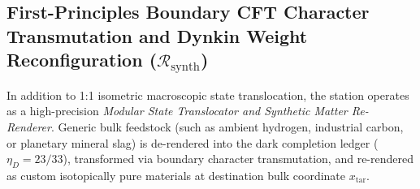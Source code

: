 \documentclass[11pt,onecolumn]{article}
\begin{document}
\FloatBarrier
\subsection[First-Principles Boundary CFT Transmutation]{First-Principles Boundary CFT Character Transmutation and Dynkin Weight Reconfiguration (\texorpdfstring{$\mathcal{R}_{\text{synth}}$}{R(synth)})}
\label{subsec:cft_transmutation}
In addition to 1:1 isometric macroscopic state translocation, the station operates as a high-precision \emph{Modular State Translocator and Synthetic Matter Re-Renderer}. Generic bulk feedstock (such as ambient hydrogen, industrial carbon, or planetary mineral slag) is de-rendered into the dark completion ledger ($\eta_D = 23/33$), transformed via boundary character transmutation, and re-rendered as custom isotopically pure materials at destination bulk coordinate $x_{\text{tar}}$.
\end{document}
